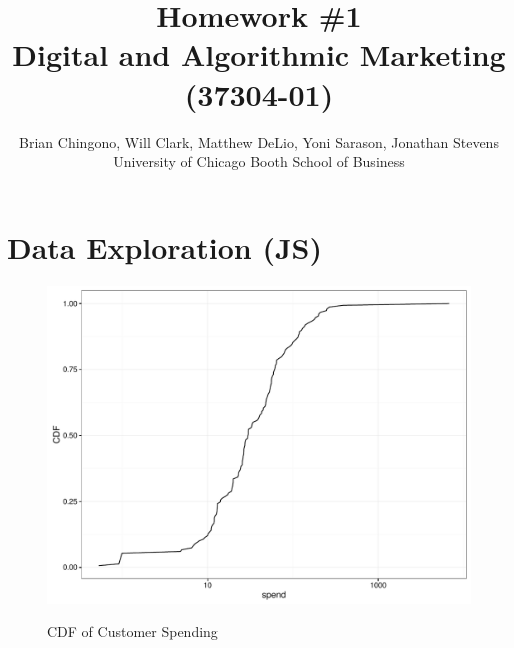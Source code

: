 



\title{Homework \#1\\
Digital and Algorithmic Marketing (37304-01)}
\author{Brian Chingono, Will Clark, Matthew DeLio, Yoni Sarason, Jonathan Stevens\\
University of Chicago Booth School of Business}

\maketitle

\section{Data Exploration (JS)}

\begin{figure}[!htb]
  \centering
  \caption{CDF of Customer Spending}
  \includegraphics[scale=.5]{cust_spend_cdf.pdf}
  \label{fig:cust_spend_cdf}
\end{figure}

